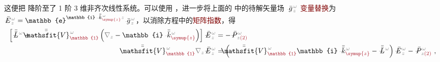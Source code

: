 这便把  降阶至了 1 阶 3 维非齐次线性系统。可以使用 ，进一步将上面的  中的待解矢量场 $\Xint{{}^{}_{\mathcolor{gray}{-}}}{10}{\bar{g}}^{\;\!\mathcolor{gray}{\omega}}_{\;\! \mathcolor{gray}{z}}$ \textcolor{Maroon}{变量替换}为 $\Xint{\mathcolor{gray}{-}}{25}{\bar{E}}^{\;\!\mathcolor{gray}{\omega}}_{\;\! \mathcolor{gray}{z}} = \mathbb{e}^{\mathbb{i} \Xint{\begin{smallmatrix} ~ \\ {}^{}_{\mathcolor{gray}{-}} \\ ~ \end{smallmatrix}}{15}{\bar{\bar{k}}}_{\textcolor{Maroon}{\symup{z}}}^{\;\! \mathcolor{gray}{\omega}} \mathcolor{gray}{z}} \Xint{{}^{}_{\mathcolor{gray}{-}}}{10}{\bar{g}}^{\;\!\mathcolor{gray}{\omega}}_{\;\! \mathcolor{gray}{z}}$，以消除方程中的\textcolor{Maroon}{矩阵指数}，得
\begin{subequations}
\begin{align}
	\left[ \Xint{\mathcolor{gray}{-}}{32}{\bar{\bar{L}}}^{\;\! \mathcolor{gray}{\omega}} + \Xint{\mathcolor{gray}{-}}{25}{\bar{\bar{\mathsfit{V}}}}^{\;\! \mathcolor{gray}{\omega}}_{\textcolor{Maroon}{\mathbb{1}}} \left( \mathcolor{gray}{\nabla_z} - \mathbb{i} \Xint{\begin{smallmatrix} ~ \\ {}^{}_{\mathcolor{gray}{-}} \\ ~ \end{smallmatrix}}{15}{\bar{\bar{k}}}_{\textcolor{Maroon}{\symup{z}}}^{\;\! \mathcolor{gray}{\omega}} \right) \right] \Xint{\mathcolor{gray}{-}}{295}{\bar{E}}^{\;\!\mathcolor{gray}{\omega}}_{\;\! \mathcolor{gray}{z}}
	&= - \Xint{\mathcolor{gray}{-}}{30}{\bar{P}}^{\;\! \mathcolor{gray}{\omega}}_{\;\! \mathcolor{gray}{z} \textcolor{Maroon}{(2)}} \label{eq:nonlinear(2)-wave_wkrho-simplify6-SVA-E} \\
	\Xint{\mathcolor{gray}{-}}{25}{\bar{\bar{\mathsfit{V}}}}^{\;\! \mathcolor{gray}{\omega}}_{\textcolor{Maroon}{\mathbb{1}}} \mathcolor{gray}{\nabla_z} \Xint{\mathcolor{gray}{-}}{295}{\bar{E}}^{\;\!\mathcolor{gray}{\omega}}_{\;\! \mathcolor{gray}{z}}
	&= \left( \Xint{\mathcolor{gray}{-}}{25}{\bar{\bar{\mathsfit{V}}}}^{\;\! \mathcolor{gray}{\omega}}_{\textcolor{Maroon}{\mathbb{1}}} \mathbb{i} \Xint{\begin{smallmatrix} ~ \\ {}^{}_{\mathcolor{gray}{-}} \\ ~ \end{smallmatrix}}{15}{\bar{\bar{k}}}_{\textcolor{Maroon}{\symup{z}}}^{\;\! \mathcolor{gray}{\omega}} - \Xint{\mathcolor{gray}{-}}{32}{\bar{\bar{L}}}^{\;\! \mathcolor{gray}{\omega}} \right) \Xint{\mathcolor{gray}{-}}{295}{\bar{E}}^{\;\!\mathcolor{gray}{\omega}}_{\;\! \mathcolor{gray}{z}} - \Xint{\mathcolor{gray}{-}}{30}{\bar{P}}^{\;\! \mathcolor{gray}{\omega}}_{\;\! \mathcolor{gray}{z} \textcolor{Maroon}{(2)}} ~,  \label{eq:nonlinear(2)-wave_wkrho-simplify6-SVA-E'}
\end{align}
\end{subequations}
